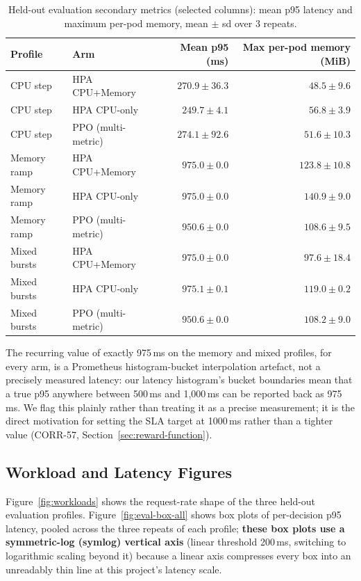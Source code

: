 \begin{table}[H]
\centering
\caption[Held-out evaluation secondary metrics]{Held-out evaluation secondary metrics (selected columns): mean p95 latency and maximum per-pod memory, mean $\pm$ sd over 3 repeats.}
\label{tab:eval-secondary-main}
\small
\begin{tabular}{llrr}
\toprule
Profile & Arm & Mean p95 (ms) & Max per-pod memory (MiB) \\
\midrule
CPU step & HPA CPU+Memory & $270.9 \pm 36.3$ & $48.5 \pm 9.6$ \\
CPU step & HPA CPU-only & $249.7 \pm 4.1$ & $56.8 \pm 3.9$ \\
CPU step & PPO (multi-metric) & $274.1 \pm 92.6$ & $51.6 \pm 10.3$ \\
Memory ramp & HPA CPU+Memory & $975.0 \pm 0.0$ & $123.8 \pm 10.8$ \\
Memory ramp & HPA CPU-only & $975.0 \pm 0.0$ & $140.9 \pm 9.0$ \\
Memory ramp & PPO (multi-metric) & $950.6 \pm 0.0$ & $108.6 \pm 9.5$ \\
Mixed bursts & HPA CPU+Memory & $975.0 \pm 0.0$ & $97.6 \pm 18.4$ \\
Mixed bursts & HPA CPU-only & $975.1 \pm 0.1$ & $119.0 \pm 0.2$ \\
Mixed bursts & PPO (multi-metric) & $950.6 \pm 0.0$ & $108.2 \pm 9.0$ \\
\bottomrule
\end{tabular}
\end{table}

The recurring value of exactly 975\,ms on the memory and mixed profiles,
for every arm, is a Prometheus histogram-bucket interpolation artefact,
not a precisely measured latency: our latency histogram's bucket
boundaries mean that a true p95 anywhere between 500\,ms and 1,000\,ms can
be reported back as 975\,ms. We flag this plainly rather than treating it
as a precise measurement; it is the direct motivation for setting the SLA
target at 1000\,ms rather than a tighter value (CORR-57,
Section~\ref{sec:reward-function}).

\subsection{Workload and Latency Figures}

Figure~\ref{fig:workloads} shows the request-rate shape of the three
held-out evaluation profiles. Figure~\ref{fig:eval-box-all}
shows box plots of per-decision p95 latency, pooled across the three
repeats of each profile; \textbf{these box plots use a symmetric-log
(symlog) vertical axis} (linear threshold 200\,ms, switching to
logarithmic scaling beyond it) because a linear axis compresses every box
into an unreadably thin line at this project's latency scale.


